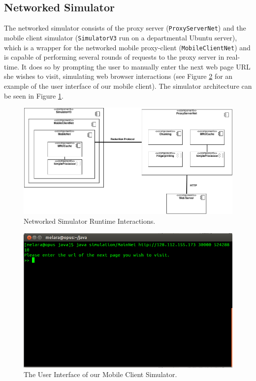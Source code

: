 \subsection{Networked Simulator}
\label{sec:netsim}
The networked simulator consists of the proxy server (\texttt{ProxyServerNet}) and the mobile client simulator (\texttt{SimulatorV3} run on a departmental Ubuntu server), which is a wrapper for the networked mobile proxy-client (\texttt{MobileClientNet}) and is capable of performing several rounds of requests to the proxy server in real-time. It does so by prompting the user to manually enter the next web page URL she wishes to visit, simulating web browser interactions (see Figure \ref{fig:mobsim_ui} for an example of the user interface of our mobile client). The simulator architecture can be seen in Figure \ref{fig:netsim_arch}. 

\begin{figure}[ht] 
\centering \includegraphics[scale=0.40]{images/component_diagram.png}
\caption{Networked Simulator Runtime Interactions.}
\label{fig:netsim_arch}
\end{figure}

\begin{figure}[h] 
\centering \includegraphics[scale=0.40]{images/mobilesim_ui.png}
\caption{The User Interface of our Mobile Client Simulator.}
\label{fig:mobsim_ui}
\end{figure}

